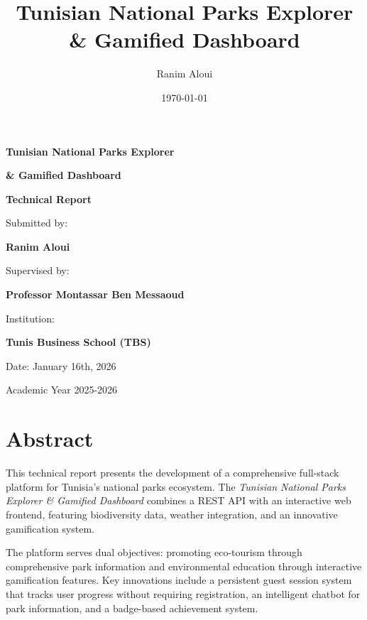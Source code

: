 \documentclass[11pt,a4paper]{article}
\title{Tunisian National Parks Explorer \\ \& Gamified Dashboard}
\author{Ranim Aloui}
\date{\today}
\begin{document}
\begin{titlepage}
    \centering
    \vspace*{2cm}

    {\Huge\bfseries Tunisian National Parks Explorer}\par
    {\Huge\bfseries \& Gamified Dashboard}\par
    \vspace{1cm}
    {\Large\bfseries Technical Report}\par
    \vspace{2cm}

    {\Large Submitted by:}\par
    {\large\bfseries Ranim Aloui}\par
    \vspace{1cm}

    {\Large Supervised by:}\par
    {\large\bfseries Professor Montassar Ben Messaoud}\par
    \vspace{1cm}

    {\Large Institution:}\par
    {\large\bfseries Tunis Business School (TBS)}\par
    \vspace{2cm}

    {\Large Date: January 16th, 2026}\par

    \vfill

    {\large Academic Year 2025-2026}\par

\end{titlepage}

\tableofcontents
\newpage

\section*{Abstract}

This technical report presents the development of a comprehensive full-stack platform for Tunisia's national parks ecosystem. The \textit{Tunisian National Parks Explorer \& Gamified Dashboard} combines a REST API with an interactive web frontend, featuring biodiversity data, weather integration, and an innovative gamification system.

The platform serves dual objectives: promoting eco-tourism through comprehensive park information and environmental education through interactive gamification features. Key innovations include a persistent guest session system that tracks user progress without requiring registration, an intelligent chatbot for park information, and a badge-based achievement system.
\end{document}
